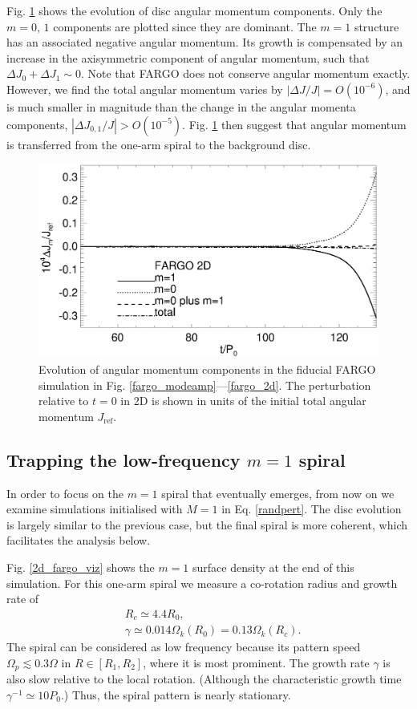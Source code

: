 Fig. \ref{2d_angmom} shows the evolution of disc angular momentum
components. Only the $m=0,\,1$ components are 
plotted since they are dominant. The $m=1$ structure has
an associated negative angular momentum.  
Its growth is compensated by an increase in the axisymmetric
component of angular momentum, such that $\Delta J_0 + \Delta
J_1 \sim 0$. Note that FARGO does not conserve angular momentum
exactly. However, we find the total angular momentum varies by 
$|\Delta J/J|= O(10^{-6})$, and is much smaller in magnitude than the
change in the angular momenta components, $|\Delta J_{0,1}/J|>
O(10^{-5})$. Fig. \ref{2d_angmom} then suggest that angular momentum
is transferred from the one-arm spiral to the background disc.    

\begin{figure}
  \includegraphics[width=\linewidth]{figures/nonaxi_evol_ang_fargo}
  \caption{Evolution of angular momentum components in the fiducial
    FARGO simulation in Fig. \ref{fargo_modeamp}---\ref{fargo_2d}. The
    perturbation relative to $t=0$ in 2D is shown in units of the 
    initial total angular momentum $J_\mathrm{ref}$.\label{2d_angmom}} 
\end{figure}   

\subsection{Trapping the low-frequency $m=1$ spiral}\label{fargo_m1}
In order to focus on the $m=1$ spiral that eventually emerges, from
now on we examine simulations initialised with
$M=1$ in Eq. \ref{randpert}. The disc 
evolution is largely similar to the previous case, but the final spiral is
more coherent, which facilitates the analysis below. 

Fig. \ref{2d_fargo_viz} shows the $m=1$ surface density
at the end of this simulation. For this one-arm spiral
we measure a co-rotation radius and growth rate of 
\begin{align*}
  &R_c \simeq 4.4R_0,\\
  &\gamma\simeq 0.014\Omega_k(R_0) = 0.13\Omega_k(R_c). 
\end{align*}
The spiral can be considered as low frequency because its 
pattern speed $\Omega_p\lesssim 0.3\Omega$ in $R\in[R_{1},R_{2}]$,
where it is  most prominent. The growth rate $\gamma$ is also slow
relative to the local rotation. (Although the characteristic growth
time $\gamma^{-1} \simeq 10P_0$.) Thus, the spiral 
pattern is nearly stationary. 

